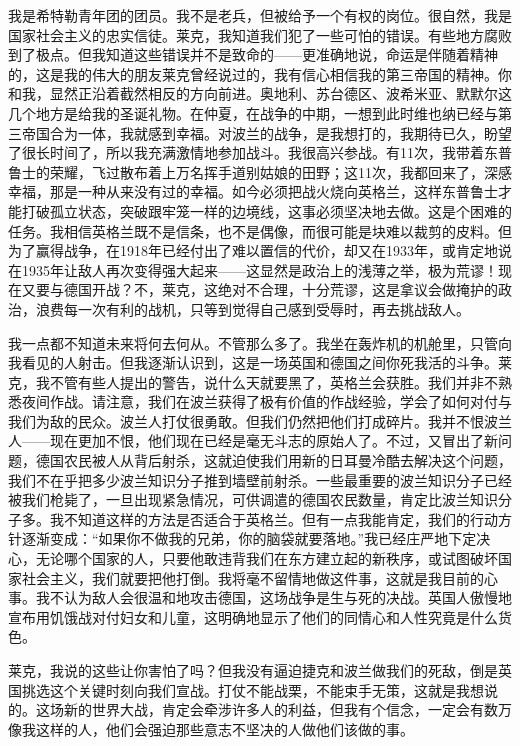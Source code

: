\documentclass[UTF8]{ctexart}
\begin{document}
我是希特勒青年团的团员。我不是老兵，但被给予一个有权的岗位。很自然，我是国家社会主义的忠实信徒。莱克，我知道我们犯了一些可怕的错误。有些地方腐败到了极点。但我知道这些错误并不是致命的——更准确地说，命运是伴随着精神的，这是我的伟大的朋友莱克曾经说过的，我有信心相信我的第三帝国的精神。你和我，显然正沿着截然相反的方向前进。奥地利、苏台德区、波希米亚、默默尔这几个地方是给我的圣诞礼物。在仲夏，在战争的中期，一想到此时维也纳已经与第三帝国合为一体，我就感到幸福。对波兰的战争，是我想打的，我期待已久，盼望了很长时间了，所以我充满激情地参加战斗。我很高兴参战。有11次，我带着东普鲁士的荣耀，飞过散布着上万名挥手道别姑娘的田野；这11次，我都回来了，深感幸福，那是一种从来没有过的幸福。如今必须把战火烧向英格兰，这样东普鲁士才能打破孤立状态，突破跟牢笼一样的边境线，这事必须坚决地去做。这是个困难的任务。我相信英格兰既不是信条，也不是偶像，而很可能是块难以裁剪的皮料。但为了赢得战争，在1918年已经付出了难以置信的代价，却又在1933年，或肯定地说在1935年让敌人再次变得强大起来——这显然是政治上的浅薄之举，极为荒谬！现在又要与德国开战？不，莱克，这绝对不合理，十分荒谬，这是拿议会做掩护的政治，浪费每一次有利的战机，只等到觉得自己感到受辱时，再去挑战敌人。

我一点都不知道未来将何去何从。不管那么多了。我坐在轰炸机的机舱里，只管向我看见的人射击。但我逐渐认识到，这是一场英国和德国之间你死我活的斗争。莱克，我不管有些人提出的警告，说什么天就要黑了，英格兰会获胜。我们并非不熟悉夜间作战。请注意，我们在波兰获得了极有价值的作战经验，学会了如何对付与我们为敌的民众。波兰人打仗很勇敢。但我们仍然把他们打成碎片。我并不恨波兰人——现在更加不恨，他们现在已经是毫无斗志的原始人了。不过，又冒出了新问题，德国农民被人从背后射杀，这就迫使我们用新的日耳曼冷酷去解决这个问题，我们不在乎把多少波兰知识分子推到墙壁前射杀。一些最重要的波兰知识分子已经被我们枪毙了，一旦出现紧急情况，可供调遣的德国农民数量，肯定比波兰知识分子多。我不知道这样的方法是否适合于英格兰。但有一点我能肯定，我们的行动方针逐渐变成：“如果你不做我的兄弟，你的脑袋就要落地。”我已经庄严地下定决心，无论哪个国家的人，只要他敢违背我们在东方建立起的新秩序，或试图破坏国家社会主义，我们就要把他打倒。我将毫不留情地做这件事，这就是我目前的心事。我不认为敌人会很温和地攻击德国，这场战争是生与死的决战。英国人傲慢地宣布用饥饿战对付妇女和儿童，这明确地显示了他们的同情心和人性究竟是什么货色。

莱克，我说的这些让你害怕了吗？但我没有逼迫捷克和波兰做我们的死敌，倒是英国挑选这个关键时刻向我们宣战。打仗不能战栗，不能束手无策，这就是我想说的。这场新的世界大战，肯定会牵涉许多人的利益，但我有个信念，一定会有数万像我这样的人，他们会强迫那些意志不坚决的人做他们该做的事。
\end{document}
